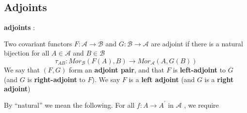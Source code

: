 \documentclass{article}
\begin{document}
\newpage
\subsection{Adjoints}
\textbf{adjoints} :

Two covariant functors $F:\mathscr A \rightarrow \mathscr B$
and $G:\mathscr B \rightarrow \mathscr A$ are adjoint if there is a natural bijection for all $A \in\mathscr A$ and $B \in\mathscr B$
$$
\tau_{AB} : Mor_\mathscr B(F(A), B) \rightarrow Mor_\mathscr A (A, G(B))
$$
We say that $(F, G)$ form an \textbf{adjoint pair}, and that $F$ is \textbf{left-adjoint} to $G$ (and $G$ is
\textbf{right-adjoint} to $F$). We say $F$ is a \textbf{left adjoint} (and $G$ is a \textbf{right adjoint})

 By “natural”
we mean the following. For all $f : A \rightarrow A^\prime$
in $\mathscr A$ , we require
\end{document}
